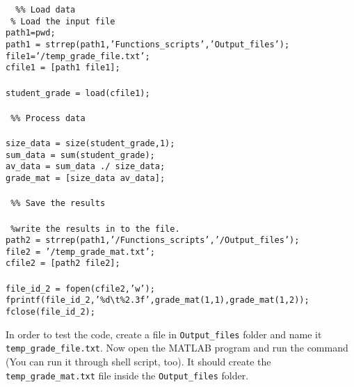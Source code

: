  \begin{mdframed}[hidealllines=true,backgroundcolor=gray!20]
 \begin{singlespace}
 \fontsize{10pt}{1pt}
 \texttt{
 \noindent
{ \color{matlab_green}\%\% Load data}\\
{ \color{matlab_green}\% Load the input file}\\
path1=pwd;\\
path1 = strrep(path1,{\color{matlab_pink}'Functions\_scripts'},{\color{matlab_pink}'Output\_files'}); \\
file1={\color{matlab_pink}'/temp\_grade\_file.txt'};\\
cfile1 = [path1 file1];\\
\\
student\_grade = load(cfile1);\\
\\
{ \color{matlab_green}\%\% Process data}\\
\\
size\_data = size(student\_grade,1);\\
sum\_data = sum(student\_grade);\\
av\_data = sum\_data ./ size\_data;\\
grade\_mat = [size\_data av\_data];\\
\\
{ \color{matlab_green}\%\% Save the results}\\
\\
{ \color{matlab_green}\%write the results in to the file.} \\
path2 = strrep(path1,{\color{matlab_pink}'/Functions\_scripts'},{\color{matlab_pink}'/Output\_files'});\\ 
file2 = {\color{matlab_pink}'/temp\_grade\_mat.txt'};\\
cfile2 = [path2 file2];\\
\\
file\_id\_2 = fopen(cfile2,{\color{matlab_pink}'w'});\\
fprintf(file\_id\_2,{\color{matlab_pink}'\%d\textbackslash t\%2.3f'},grade\_mat(1,1),grade\_mat(1,2));\\
fclose(file\_id\_2);
}
\end{singlespace}
\end{mdframed}
\noindent
In order to test the code, create a file in \texttt{Output\_files} folder and name it \texttt{temp\_grade\_file.txt}. Now open the MATLAB program and run the command (You can run it through shell script, too). It should create the \texttt{temp\_grade\_mat.txt} file inside the  \texttt{Output\_files} folder. \\
